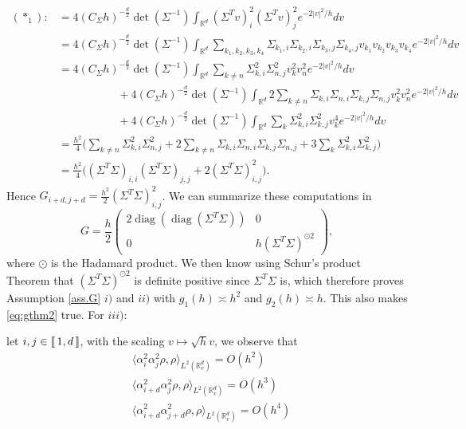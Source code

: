 \documentclass[12pt]{amsart}
\newcommand{\diag}{\operatorname{diag}}
\newcommand{\R}{\mathbb R}
\def\<{\langle}
\def\>{\rangle}
\numberwithin{equation}{section}
\numberwithin{figure}{section}
\newcommand{\lb}{\operatorname{[\negthinspace [}}
\newcommand{\rb}{\operatorname{]\negthinspace ]}}
\begin{document}
\begin{equation*}
\begin{aligned}
    (\ast_1) :&= 4(C_\Sigma h)^{-\frac d2}\det(\Sigma^{-1})\int_{\R^d}(\Sigma^Tv)_i^2(\Sigma^T v)_j^2e^{-2|v|^2/h}dv\\
    &= 4(C_\Sigma h)^{-\frac d2}\det(\Sigma^{-1})\int_{\R^d}\sum_{k_1,k_2,k_3,k_4}\Sigma_{k_1,i}\Sigma_{k_2,i}\Sigma_{k_3,j}\Sigma_{k_4,j}v_{k_1}v_{k_2}v_{k_3}v_{k_4}e^{-2|v|^2/h}dv\\
    &= 4(C_\Sigma h)^{-\frac d2}\det(\Sigma^{-1})\int_{\R^d}\sum_{k\neq n}\Sigma_{k,i}^2\Sigma_{n,j}^2v_k^2v_n^2e^{-2|v|^2/h}dv\\
    &\phantom{********} + 4(C_\Sigma h)^{-\frac d2}\det(\Sigma^{-1})\int_{\R^d}2\sum_{k\neq n}\Sigma_{k,i}\Sigma_{n,i}\Sigma_{k,j}\Sigma_{n,j}v_k^2v_n^2e^{-2|v|^2/h}dv\\
    &\phantom{********} + 4(C_\Sigma h)^{-\frac d2}\det(\Sigma^{-1})\int_{\R^d}\sum_{k}\Sigma_{k,i}^2\Sigma_{k,j}^2v_k^4e^{-2|v|^2/h}dv\\
    &= \frac{h^2}{4}\big(\sum_{k\neq n}\Sigma_{k,i}^2\Sigma_{n,j}^2 + 2\sum_{k\neq n}\Sigma_{k,i}\Sigma_{n,i}\Sigma_{k,j}\Sigma_{n,j} + 3\sum_{k}\Sigma_{k,i}^2\Sigma_{k,j}^2\big)\\
    &= \frac{h^2}{4}\big((\Sigma^T\Sigma)_{i,i}(\Sigma^T\Sigma)_{j,j} + 2(\Sigma^T\Sigma)_{i,j}^2\big).
\end{aligned}
\end{equation*}
Hence %
$G_{i+d,j+d} = \frac{h^2}{2}(\Sigma^T\Sigma)_{i,j}^2$. We can summarize these computations in
\begin{equation*}
G = \frac h2\left(\begin{array}{c|c}
    2\diag(\diag(\Sigma^T\Sigma)) & 0 \\
    \hline
    0 & h(\Sigma^T\Sigma)^{\odot 2}
\end{array}\right),
\end{equation*}
where $\odot$ is the Hadamard product. We then know using Schur's product Theorem \cite[Theorem VII]{Sc11} that $(\Sigma^T\Sigma)^{\odot 2}$ is definite positive since $\Sigma^T\Sigma$ is, which therefore proves Assumption \ref{ass.G} $i)$ and $ii)$ with $g_1(h)\asymp h^2$ and $g_2(h)\asymp h$. This also makes \eqref{eq:gthm2} true. For $iii)$:

let $i,j\in\lb1,d\rb$, with the scaling $v\mapsto\sqrt{h}v$, we observe that
\begin{equation*}
\begin{aligned}
    &\<\alpha_i^2\alpha_j^2\rho,\rho\>_{L^2(\R^d_v)} = O(h^2)\\
    &\<\alpha_{i+d}^2\alpha_j^2\rho,\rho\>_{L^2(\R^d_v)} = O(h^3)\\
    &\<\alpha_{i+d}^2\alpha_{j+d}^2\rho,\rho\>_{L^2(\R^d_v)} = O(h^4)
\end{aligned}
\end{equation*}
\end{document}
